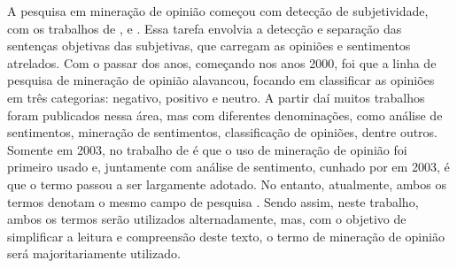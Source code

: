 \documentclass[template.tex]{subfiles}
\begin{document}
%
%
%
%

A pesquisa em mineração de opinião começou com detecção de subjetividade, com os trabalhos de \cite{carbonell1979subjective}, \cite{wilks1983beliefs} e \cite{wilson2004just}. Essa tarefa envolvia a detecção e separação das sentenças objetivas das subjetivas, que carregam as opiniões e sentimentos atrelados. Com o passar dos anos, começando nos anos 2000, foi que a linha de pesquisa de mineração de opinião alavancou, focando em classificar as opiniões em três categorias: negativo, positivo e neutro. A partir daí muitos trabalhos foram publicados nessa área, mas com diferentes denominações, como análise de sentimentos, mineração de sentimentos, classificação de opiniões, dentre outros. Somente em 2003, no trabalho de \cite{dave2003mining} é que o uso de mineração de opinião foi primeiro usado e, juntamente com análise de sentimento, cunhado por \cite{nasukawa2003sentiment} em 2003, é que o termo passou a ser largamente adotado. No entanto, atualmente, ambos os termos denotam o mesmo campo de pesquisa \cite{bing:2012, pang:2008}. Sendo assim, neste trabalho, ambos os termos serão utilizados alternadamente, mas, com o objetivo de simplificar a leitura e compreensão deste texto, o termo de mineração de opinião será majoritariamente utilizado.
\end{document}

